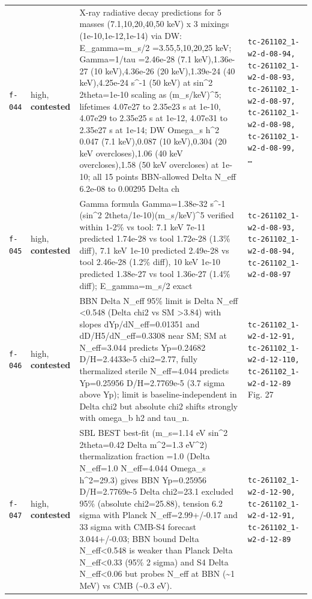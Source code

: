 \documentclass[11pt,a4paper]{article}
\begin{document}
\begin{longtable}{@{}p{}p{}p{}p{}@{}}
\texttt{f-044} & high, \textbf{contested} & X-ray radiative decay predictions for 5 masses (7.1,10,20,40,50 keV) x 3 mixings (1e-10,1e-12,1e-14) via DW: E\_gamma=m\_s/2 =3.55,5,10,20,25 keV; Gamma=1/tau =2.46e-28 (7.1 keV),1.36e-27 (10 keV),4.36e-26 (20 keV),1.39e-24 (40 keV),4.25e-24 s\textasciicircum{}-1 (50 keV) at sin\textasciicircum{}2 2theta=1e-10 scaling as (m\_s/keV)\textasciicircum{}5; lifetimes 4.07e27 to 2.35e23 s at 1e-10, 4.07e29 to 2.35e25 s at 1e-12, 4.07e31 to 2.35e27 s at 1e-14; DW Omega\_s h\textasciicircum{}2 0.047 (7.1 keV),0.087 (10 keV),0.304 (20 keV overcloses),1.06 (40 keV overcloses),1.58 (50 keV overcloses) at 1e-10; all 15 points BBN-allowed Delta N\_eff 6.2e-08 to 0.00295 Delta ch & \texttt{tc-261102\_\allowbreak{}1-w2-d-08-94,\allowbreak{} tc-261102\_\allowbreak{}1-w2-d-08-93,\allowbreak{} tc-261102\_\allowbreak{}1-w2-d-08-97,\allowbreak{} tc-261102\_\allowbreak{}1-w2-d-08-98,\allowbreak{} tc-261102\_\allowbreak{}1-w2-d-08-99,\allowbreak{} \ldots{}\allowbreak{}} \\
\texttt{f-045} & high, \textbf{contested} & Gamma formula Gamma=1.38e-32 s\textasciicircum{}-1 (sin\textasciicircum{}2 2theta/1e-10)(m\_s/keV)\textasciicircum{}5 verified within 1-2\% vs tool: 7.1 keV 7e-11 predicted 1.74e-28 vs tool 1.72e-28 (1.3\% diff), 7.1 keV 1e-10 predicted 2.49e-28 vs tool 2.46e-28 (1.2\% diff), 10 keV 1e-10 predicted 1.38e-27 vs tool 1.36e-27 (1.4\% diff); E\_gamma=m\_s/2 exact & \texttt{tc-261102\_\allowbreak{}1-w2-d-08-93,\allowbreak{} tc-261102\_\allowbreak{}1-w2-d-08-94,\allowbreak{} tc-261102\_\allowbreak{}1-w2-d-08-97} \\
\texttt{f-046} & high, \textbf{contested} & BBN Delta N\_eff 95\% limit is Delta N\_eff \textless{}0.548 (Delta chi2 vs SM \textgreater{}3.84) with slopes dYp/dN\_eff=0.01351 and dD/H5/dN\_eff=0.3308 near SM; SM at N\_eff=3.044 predicts Yp=0.24682 D/H=2.4433e-5 chi2=2.77, fully thermalized sterile N\_eff=4.044 predicts Yp=0.25956 D/H=2.7769e-5 (3.7 sigma above Yp); limit is baseline-independent in Delta chi2 but absolute chi2 shifts strongly with omega\_b h2 and tau\_n. & \texttt{tc-261102\_\allowbreak{}1-w2-d-12-91,\allowbreak{} tc-261102\_\allowbreak{}1-w2-d-12-110,\allowbreak{} tc-261102\_\allowbreak{}1-w2-d-12-89} Fig. 27 \\
\texttt{f-047} & high, \textbf{contested} & SBL BEST best-fit (m\_s=1.14 eV sin\textasciicircum{}2 2theta=0.42 Delta m\textasciicircum{}2=1.3 eV\textasciicircum{}2) thermalization fraction =1.0 (Delta N\_eff=1.0 N\_eff=4.044 Omega\_s h\textasciicircum{}2=29.3) gives BBN Yp=0.25956 D/H=2.7769e-5 Delta chi2=23.1 excluded 95\% (absolute chi2=25.88), tension 6.2 sigma with Planck N\_eff=2.99+/-0.17 and 33 sigma with CMB-S4 forecast 3.044+/-0.03; BBN bound Delta N\_eff\textless{}0.548 is weaker than Planck Delta N\_eff\textless{}0.33 (95\% 2 sigma) and S4 Delta N\_eff\textless{}0.06 but probes N\_eff at BBN (\textasciitilde{}1 MeV) vs CMB (\textasciitilde{}0.3 eV). & \texttt{tc-261102\_\allowbreak{}1-w2-d-12-90,\allowbreak{} tc-261102\_\allowbreak{}1-w2-d-12-91,\allowbreak{} tc-261102\_\allowbreak{}1-w2-d-12-89} \\

\end{longtable}
\end{document}
